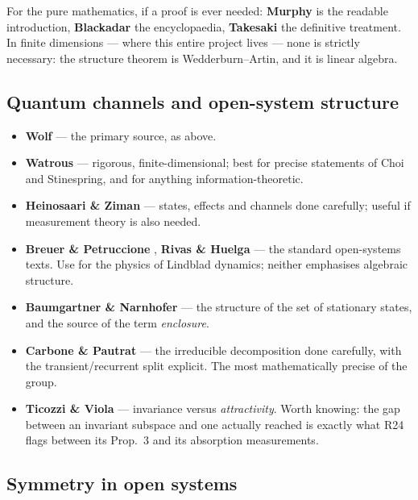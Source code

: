 \documentclass[11pt]{article}
\theoremstyle{plain}
\theoremstyle{remark}
\begin{document}
\noindent For the pure mathematics, if a proof is ever needed:
\textbf{Murphy} \cite{Murphy1990} is the readable introduction,
\textbf{Blackadar} \cite{Blackadar2006} the encyclopaedia, \textbf{Takesaki}
\cite{Takesaki2002} the definitive treatment. In finite dimensions --- where
this entire project lives --- none is strictly necessary: the structure theorem
is Wedderburn--Artin, and it is linear algebra.

\subsection{Quantum channels and open-system structure}

\begin{itemize}
\item \textbf{Wolf} \cite{Wolf2012} --- the primary source, as above.
\item \textbf{Watrous} \cite{Watrous2018} --- rigorous, finite-dimensional;
best for precise statements of Choi and Stinespring, and for anything
information-theoretic.
\item \textbf{Heinosaari \& Ziman} \cite{HZ2011} --- states, effects and
channels done carefully; useful if measurement theory is also needed.
\item \textbf{Breuer \& Petruccione} \cite{BP2002}, \textbf{Rivas \& Huelga}
\cite{RH2012} --- the standard open-systems texts. Use for the physics of
Lindblad dynamics; neither emphasises algebraic structure.
\item \textbf{Baumgartner \& Narnhofer} \cite{BN2008} --- the structure of the
set of stationary states, and the source of the term \emph{enclosure}.
\item \textbf{Carbone \& Pautrat} \cite{CP2016} --- the irreducible
decomposition done carefully, with the transient/recurrent split explicit. The
most mathematically precise of the group.
\item \textbf{Ticozzi \& Viola} \cite{TV2008} --- invariance versus
\emph{attractivity}. Worth knowing: the gap between an invariant subspace and
one actually reached is exactly what R24 flags between its Prop.~3 and its
absorption measurements.
\end{itemize}

\subsection{Symmetry in open systems}
\end{document}

